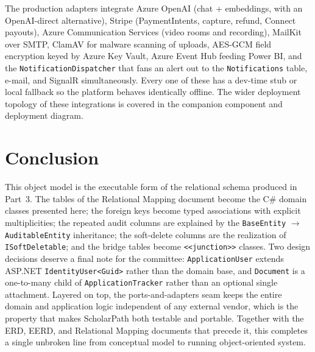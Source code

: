 \documentclass[11pt,a4paper]{article}
\begin{document}
The production adapters integrate Azure OpenAI (chat + embeddings, with an
OpenAI-direct alternative), Stripe (PaymentIntents, capture, refund, Connect
payouts), Azure Communication Services (video rooms and recording), MailKit over
SMTP, ClamAV for malware scanning of uploads, AES-GCM field encryption keyed by
Azure Key Vault, Azure Event Hub feeding Power BI, and the
\texttt{NotificationDispatcher} that fans an alert out to the
\texttt{Notifications} table, e-mail, and SignalR simultaneously. Every one of
these has a dev-time stub or local fallback so the platform behaves identically
offline. The wider deployment topology of these integrations is covered in the
companion component and deployment diagram.

\section{Conclusion}

This object model is the executable form of the relational schema produced in
Part~3. The tables of the Relational Mapping document become the C\# domain
classes presented here; the foreign keys become typed associations with explicit
multiplicities; the repeated audit columns are explained by the
\texttt{BaseEntity} $\rightarrow$ \texttt{AuditableEntity} inheritance; the
soft-delete columns are the realization of \texttt{ISoftDeletable}; and the bridge
tables become \texttt{<<junction>>} classes. Two design decisions deserve a final
note for the committee: \texttt{ApplicationUser} extends ASP.NET
\texttt{IdentityUser<Guid>} rather than the domain base, and \texttt{Document} is
a one-to-many child of \texttt{ApplicationTracker} rather than an optional single
attachment. Layered on top, the ports-and-adapters seam keeps the entire domain
and application logic independent of any external vendor, which is the property
that makes ScholarPath both testable and portable. Together with the ERD, EERD,
and Relational Mapping documents that precede it, this completes a single
unbroken line from conceptual model to running object-oriented system.
\end{document}
